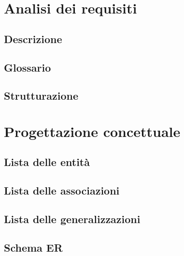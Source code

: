 \documentclass[12pt]{article}
\begin{document}
\section{Analisi dei requisiti}
	\subsection{Descrizione}
	\subsection{Glossario}
	\subsection{Strutturazione}
\section{Progettazione concettuale}
	\subsection{Lista delle entità}
	\subsection{Lista delle associazioni}
	\subsection{Lista delle generalizzazioni}
	\subsection{Schema ER}
\end{document}

